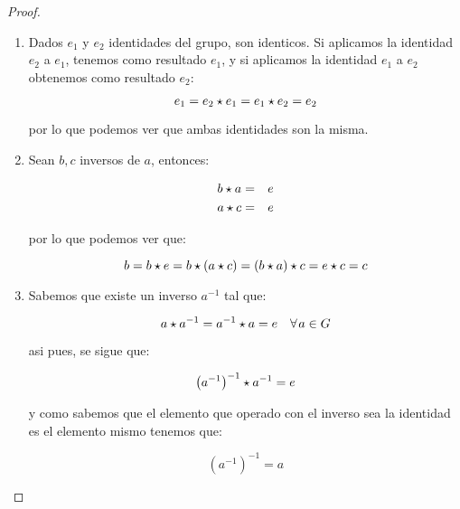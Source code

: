         \begin{proof}\mbox{}\\
            \begin{enumerate}
                \item Dados $e_1$ y $e_2$ identidades del grupo, son identicos.
                Si aplicamos la identidad $e_2$ a $e_1$, tenemos como resultado $e_1$, y si aplicamos la identidad $e_1$ a $e_2$ obtenemos como resultado $e_2$:

                \begin{equation*}
                    e_1 = e_2 \star e_1 = e_1 \star e_2 = e_2
                \end{equation*}

                por lo que podemos ver que ambas identidades son la misma.

                \item Sean $b, c$ inversos de $a$, entonces:

                \begin{eqnarray*}
                    b \star a & = & e \\
                    a \star c & = & e
                \end{eqnarray*}

                por lo que podemos ver que:

                \begin{equation*}
                    b = b \star e = b \star (a \star c) = (b \star a) \star c = e \star c = c
                \end{equation*}

                \item Sabemos que existe un inverso $a^{-1}$ tal que:

                \begin{equation*}
                    a \star a^{-1} = a^{-1} \star a = e \quad \forall \mkern2mu a \in G
                \end{equation*}

                asi pues, se sigue que:

                \begin{equation*}
                    \left( a^{-1} \right)^{-1} \star a^{-1} = e
                \end{equation*}

                y como sabemos que el elemento que operado con el inverso sea la identidad es el elemento mismo tenemos que:

                \begin{equation*}
                    \left( a^{-1} \right)^{-1} = a
                \end{equation*}


\end{enumerate}
\end{proof}
